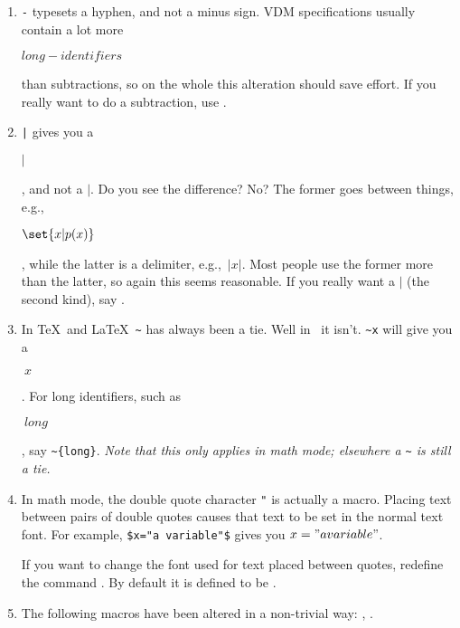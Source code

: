 {\begin{enumerate}
	you want a subscript use \verb;@;, e.g.,~$x@0$ is typed
	\verb;x@0;, or use \TeX's \cs\sb\ macro.  An \verb;@; is still an
	@ when not in math mode.  Occasionally you may find that an @
	in math mode {\em doesn't\/} give you a subscript.  Should
	this happen, you are advised to use \TeX's \cs\sb\ macro,
	e.g.,~\verb;$x\sb0$;. 
	\begin{dangerous}
	\indent If you don't use
	underscores much, and you want to use \verb;_; for subscripts,
	you can say \cs\underscoreon\ (and \cs\underscoreoff\ to
	make it revert to its usual meaning in \Vdm).
	\end{dangerous}
\item	\verb;-; typesets a hyphen, and not a minus sign.  VDM specifications
	usually contain a lot more
	\begin{vdm}$long-identifiers$\end{vdm} than subtractions, so
	on the whole this alteration should save effort.  If you really want
	to do a subtraction, use \cs\minus.
\item	\verb;|; gives you a \begin{vdm}$|$\end{vdm}, and not a $\vert$.
	Do you see the difference?  No?  The former goes between things,
	e.g., \begin{vdm}$\set{x|p(x)}$\end{vdm}, while the latter is
	a delimiter, e.g.,~$|x|$.
	Most people use the former more than the latter, so again this
	seems reasonable.  If you really want a $|$ (the second kind),
	say \cs\vert. 
\item	In \TeX\ and \LaTeX\ \verb;~; has always been a tie.  Well
	in \Vdm\ it isn't.  \verb;~x; will give you a
	\begin{vdm}$~x$\end{vdm}.  For long identifiers, such as
	\begin{vdm}$~{long}$\end{vdm}, say
	\verb;~{long};.  {\em Note that this only applies in math
	mode; elsewhere a \verb;~; is still a tie.} 
\item	In math mode, the double quote character \verb;"; is actually
	a macro.  Placing text between pairs of double quotes causes
	that text to be set in the normal text font.  For example,
	\verb;$x="a variable"$; gives you $x="a variable"$.  
	\begin{dangerous}
	\indent If you want to change the font used for text placed between
	quotes, redefine the command \cs\mathTextFont.  By default
	it is defined to be \cs\rm.
	\end{dangerous}
\item	The following macros have been altered in a non-trivial way:
	\cs\forall, \cs\exists.
\end{enumerate}

}

